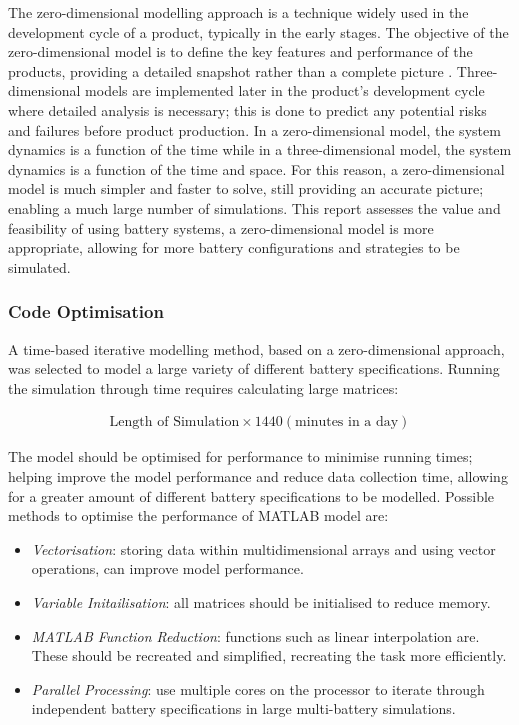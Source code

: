 The zero-dimensional modelling approach is a technique widely used in
the development cycle of a product, typically in the early stages. The
objective of the zero-dimensional model is to define the key features
and performance of the products, providing a detailed snapshot rather
than a complete picture \autocite[online]{ZeroDMod80}. Three-dimensional
models are implemented later in the product's development cycle where
detailed analysis is necessary; this is done to predict any potential
risks and failures before product production. In a zero-dimensional
model, the system dynamics is a function of the time while in a
three-dimensional model, the system dynamics is a function of the time
and space. For this reason, a zero-dimensional model is much simpler and
faster to solve, still providing an accurate picture; enabling a much
large number of simulations. This report assesses the value and
feasibility of using battery systems, a zero-dimensional model is more
appropriate, allowing for more battery configurations and strategies to
be simulated.

\subsubsection{Code Optimisation}\label{code-optimisation}

A time-based iterative modelling method, based on a zero-dimensional
approach, was selected to model a large variety of different battery
specifications. Running the simulation through time requires calculating
large matrices:

\begin{align*}
\text{Length of Simulation}  \times 1440 (\text{minutes in a day})
\end{align*}

The model should be optimised for performance to minimise running times;
helping improve the model performance and reduce data collection time,
allowing for a greater amount of different battery specifications to be
modelled. Possible methods to optimise the performance of MATLAB model
are:

\begin{itemize}
\tightlist
\item
  \emph{Vectorisation}: storing data within multidimensional arrays and
  using vector operations, can improve model performance.
\item
  \emph{Variable Initailisation}: all matrices should be initialised to
  reduce memory.
\item
  \emph{MATLAB Function Reduction}: functions such as linear
  interpolation are. These should be recreated and simplified,
  recreating the task more efficiently.
\item
  \emph{Parallel Processing}: use multiple cores on the processor to
  iterate through independent battery specifications in large
  multi-battery simulations.
\end{itemize}

